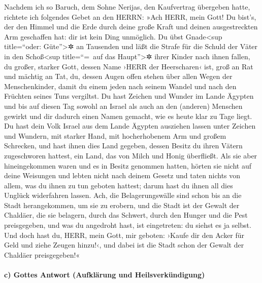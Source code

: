 Nachdem ich so Baruch, dem Sohne Nerijas, den Kaufvertrag
übergeben hatte, richtete ich folgendes Gebet an den HERRN:
»Ach HERR, mein Gott! Du bist's, der den Himmel und die
Erde durch deine große Kraft und deinen ausgestreckten Arm geschaffen
hat: dir ist kein Ding unmöglich. Du übst
Gnade\textless sup title=``oder: Güte''\textgreater✲ an Tausenden und
läßt die Strafe für die Schuld der Väter in den Schoß\textless sup
title=``=~auf das Haupt''\textgreater✲ ihrer Kinder nach ihnen fallen,
du großer, starker Gott, dessen Name ›HERR der Heerscharen‹ ist,
groß an Rat und mächtig an Tat, du, dessen Augen offen
stehen über allen Wegen der Menschenkinder, damit du einem jeden nach
seinem Wandel und nach den Früchten seines Tuns vergiltst.
Du hast Zeichen und Wunder im Lande Ägypten und bis auf
diesen Tag sowohl an Israel als auch an den (anderen) Menschen gewirkt
und dir dadurch einen Namen gemacht, wie es heute klar zu Tage liegt.
Du hast dein Volk Israel aus dem Lande Ägypten ausziehen
lassen unter Zeichen und Wundern, mit starker Hand, mit hocherhobenem
Arm und großem Schrecken, und hast ihnen dies Land
gegeben, dessen Besitz du ihren Vätern zugeschworen hattest, ein Land,
das von Milch und Honig überfließt. Als sie aber
hineingekommen waren und es in Besitz genommen hatten, hörten sie nicht
auf deine Weisungen und lebten nicht nach deinem Gesetz und taten nichts
von allem, was du ihnen zu tun geboten hattest; darum hast du ihnen all
dies Unglück widerfahren lassen. Ach, die
Belagerungswälle sind schon bis an die Stadt herangekommen, um sie zu
erobern, und die Stadt ist der Gewalt der Chaldäer, die sie belagern,
durch das Schwert, durch den Hunger und die Pest preisgegeben, und was
du angedroht hast, ist eingetreten: du siehst es ja selbst.
Und doch hast du, HERR, mein Gott, mir geboten: ›Kaufe
dir den Acker für Geld und ziehe Zeugen hinzu!‹, und dabei ist die Stadt
schon der Gewalt der Chaldäer preisgegeben!«

\hypertarget{c-gottes-antwort-aufkluxe4rung-und-heilsverkuxfcndigung}{%
\paragraph{c) Gottes Antwort (Aufklärung und
Heilsverkündigung)}\label{c-gottes-antwort-aufkluxe4rung-und-heilsverkuxfcndigung}}

